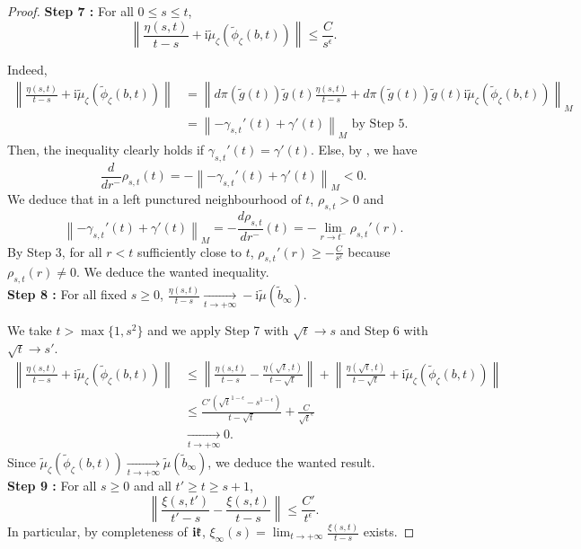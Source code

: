 \documentclass{article}
\theoremstyle{remark}
\theoremstyle{definition}
\newcommand{\tend}[2]{\underset{#1 \rightarrow #2}{\longrightarrow}}
\renewcommand{\i}{\boldsymbol{\mathrm{i}}}
\newcommand{\norme}[1]{\left\| #1 \right\|}
\renewcommand{\leq}{\leqslant}
\renewcommand{\geq}{\geqslant}
\begin{document}
\begin{proof}
\noindent\textbf{Step 7 :} For all $0 \leq s \leq t$,
$$
\norme{\frac{\eta(s,t)}{t - s} + \i\tilde{\mu}_\zeta(\tilde{\phi}_\zeta(b,t))} \leq \frac{C}{s^\epsilon}.
$$

Indeed,
\begin{align*}
    \norme{\frac{\eta(s,t)}{t - s} + \i\tilde{\mu}_\zeta(\tilde{\phi}_\zeta(b,t))} & = \norme{d\pi(\tilde{g}(t))\tilde{g}(t)\frac{\eta(s,t)}{t - s} + d\pi(\tilde{g}(t))\tilde{g}(t)\i\tilde{\mu}_\zeta(\tilde{\phi}_\zeta(b,t))}_M\\
    & = \norme{-\gamma_{s,t}'(t) + \gamma'(t)}_M \textrm{ by Step 5.}
\end{align*}
Then, the inequality clearly holds if $\gamma_{s,t}'(t) = \gamma'(t)$. Else, by \cite[Lemma A.3]{GRS}, we have
$$
\frac{d}{dr^-}\rho_{s,t}(t) = -\norme{-\gamma_{s,t}'(t) + \gamma'(t)}_M < 0.
$$
We deduce that in a left punctured neighbourhood of $t$, $\rho_{s,t} > 0$ and
$$
\norme{-\gamma_{s,t}'(t) + \gamma'(t)}_M = -\frac{d\rho_{s,t}}{dr^-}(t) = -\lim_{r \rightarrow t^-} \rho_{s,t}'(r).
$$
By Step 3, for all $r < t$ sufficiently close to $t$, $\rho_{s,t}'(r) \geq -\frac{C}{s^\epsilon}$ because $\rho_{s,t}(r) \neq 0$. We deduce the wanted inequality.\\

\noindent\textbf{Step 8 :} For all fixed $s \geq 0$, $\frac{\eta(s,t)}{t - s} \tend{t}{+\infty} -\i\tilde{\mu}(\tilde{b}_\infty)$.

We take $t > \max\{1,s^2\}$ and we apply Step 7 with $\sqrt{t} \rightarrow s$ and Step 6 with $\sqrt{t} \rightarrow s'$.
\begin{align*}
    \norme{\frac{\eta(s,t)}{t - s} + \i\tilde{\mu}_\zeta(\tilde{\phi}_\zeta(b,t))} & \leq \norme{\frac{\eta(s,t)}{t - s} - \frac{\eta(\sqrt{t},t)}{t - \sqrt{t}}} + \norme{\frac{\eta(\sqrt{t},t)}{t - \sqrt{t}} + \i\tilde{\mu}_\zeta(\tilde{\phi}_\zeta(b,t))}\\
    & \leq \frac{C'(\sqrt{t}^{1 - \epsilon} - s^{1 - \epsilon})}{t - \sqrt{t}} + \frac{C}{\sqrt{t}^\epsilon}\\
    & \tend{t}{+\infty} 0.
\end{align*}
Since $\tilde{\mu}_\zeta(\tilde{\phi}_\zeta(b,t)) \tend{t}{+\infty} \tilde{\mu}(\tilde{b}_\infty)$, we deduce the wanted result.\\

\noindent\textbf{Step 9 :} For all $s \geq 0$ and all $t' \geq t \geq s + 1$,
$$
\norme{\frac{\xi(s,t')}{t' - s} - \frac{\xi(s,t)}{t - s}} \leq \frac{C'}{t^\epsilon}.
$$
In particular, by completeness of $\i\frak{k}$, $\xi_\infty(s) = \lim_{t \rightarrow +\infty} \frac{\xi(s,t)}{t - s}$ exists.


\end{proof}
\end{document}
